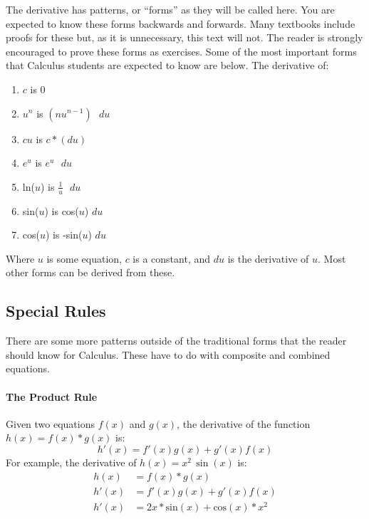 \documentclass[../revisedmain.tex]{subfiles}
\begin{document}
\par The derivative has patterns, or ``forms'' as they will be called here. You are expected to know these forms backwards and forwards. Many textbooks include proofs for these but, as it is unnecessary, this text will not. The reader is strongly encouraged to prove these forms as exercises. Some of the most important forms that Calculus students are expected to know are below. The derivative of:
\begin{enumerate}
	\item $c$ is 0
	\item $u^n$ is $(nu^{n-1})\text{ } du$
	\item $cu$ is $c*(du)$
	\item $e^u$ is $e^u\text{ } du$
	\item ln($u$) is $\frac{1}{u}\text{ }du$
	\item sin($u$) is cos($u$) $du$
	\item cos($u$) is -sin($u$) $du$
\end{enumerate}
Where $u$ is some equation, $c$ is a constant, and $du$ is the derivative of $u$. Most other forms can be derived from these.
\subsection{Special Rules}
\par There are some more patterns outside of the traditional forms that the reader should know for Calculus. These have to do with composite and combined equations.
\paragraph{The Product Rule} Given two equations $f(x)$ and $g(x)$, the derivative of the function $h(x)=f(x)*g(x)$ is: $$h'(x)=f'(x)g(x)+g'(x)f(x)$$ For example, the derivative of $h(x)=x^2\,\sin(x)$ is: 
\begin{equation}
\begin{split}
h(x)&=f(x)*g(x) \\
h'(x)&=f'(x)g(x)+g'(x)f(x) \\
h'(x) &= 2x*\text{sin}(x)+\text{cos}(x)*x^2
\end{split}
\end{equation}
\end{document}
